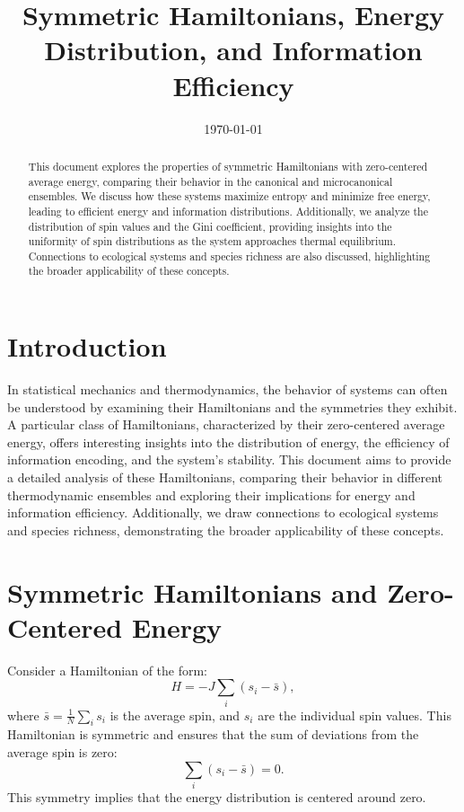 \documentclass{article}
\title{Symmetric Hamiltonians, Energy Distribution, and Information Efficiency}
\author{}
\date{\today}
\begin{document}
\maketitle

\begin{abstract}
This document explores the properties of symmetric Hamiltonians with zero-centered average energy, comparing their behavior in the canonical and microcanonical ensembles. We discuss how these systems maximize entropy and minimize free energy, leading to efficient energy and information distributions. Additionally, we analyze the distribution of spin values and the Gini coefficient, providing insights into the uniformity of spin distributions as the system approaches thermal equilibrium. Connections to ecological systems and species richness are also discussed, highlighting the broader applicability of these concepts.
\end{abstract}

\section{Introduction}
In statistical mechanics and thermodynamics, the behavior of systems can often be understood by examining their Hamiltonians and the symmetries they exhibit. A particular class of Hamiltonians, characterized by their zero-centered average energy, offers interesting insights into the distribution of energy, the efficiency of information encoding, and the system's stability. This document aims to provide a detailed analysis of these Hamiltonians, comparing their behavior in different thermodynamic ensembles and exploring their implications for energy and information efficiency. Additionally, we draw connections to ecological systems and species richness, demonstrating the broader applicability of these concepts.

\section{Symmetric Hamiltonians and Zero-Centered Energy}
Consider a Hamiltonian of the form:
\begin{equation}
H = -J \sum_i (s_i - \bar{s}),
\end{equation}
where \( \bar{s} = \frac{1}{N} \sum_i s_i \) is the average spin, and \( s_i \) are the individual spin values. This Hamiltonian is symmetric and ensures that the sum of deviations from the average spin is zero:
\begin{equation}
\sum_i (s_i - \bar{s}) = 0.
\end{equation}
This symmetry implies that the energy distribution is centered around zero.
\end{document}
